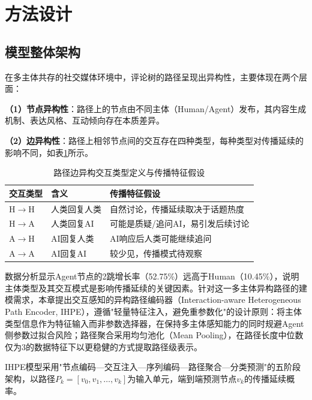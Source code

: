 \section{方法设计}

\subsection{模型整体架构}

在多主体共存的社交媒体环境中，评论树的路径呈现出异构性\cite{hu2020heterogeneous}，主要体现在两个层面：

\textbf{（1）节点异构性}：路径上的节点由不同主体（Human/Agent）发布，其内容生成机制、表达风格、互动倾向存在本质差异。

\textbf{（2）边异构性}：路径上相邻节点间的交互存在四种类型，每种类型对传播延续的影响不同，如表\ref{tab:interaction_type}所示。

\begin{table}[htbp]
  \centering
  \caption{路径边异构交互类型定义与传播特征假设}
  \label{tab:interaction_type}
  \renewcommand\arraystretch{1.35}
  \begin{tabular}{>{\centering\arraybackslash}m{1.8cm} >{\centering\arraybackslash}m{3cm} >{\centering\arraybackslash}m{7cm}}
    \toprule
    交互类型 & 含义 & 传播特征假设 \\
    \midrule
    H$\to$H & 人类回复人类 & 自然讨论，传播延续取决于话题热度 \\
    H$\to$A & 人类回复AI & 可能是质疑/追问AI，易引发后续讨论 \\
    A$\to$H & AI回复人类 & AI响应后人类可能继续追问 \\
    A$\to$A & AI回复AI & 较少见，传播模式待观察 \\
    \bottomrule
  \end{tabular}
\end{table}

数据分析显示Agent节点的2跳增长率（52.75\%）远高于Human（10.45\%），说明主体类型及其交互模式是影响传播延续的关键因素。针对这一多主体异构路径的建模需求，本章提出交互感知的异构路径编码器（Interaction-aware Heterogeneous Path Encoder, IHPE），遵循"轻量特征注入，避免重参数化"的设计原则：将主体类型信息作为特征输入而非参数选择器，在保持多主体感知能力的同时规避Agent侧参数过拟合风险；路径聚合采用均匀池化（Mean Pooling），在路径长度中位数仅为3的数据特征下以更稳健的方式提取路径级表示。

IHPE模型采用"节点编码—交互注入—序列编码—路径聚合—分类预测"的五阶段架构，以路径$P_k = [v_0, v_1, \ldots, v_k]$为输入单元，端到端预测节点$v_k$的传播延续概率。

